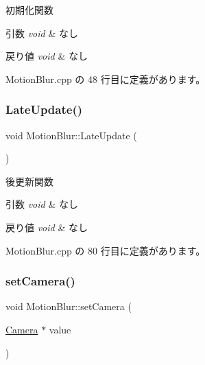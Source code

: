 初期化関数 


\begin{DoxyParams}{引数}
{\em void} & なし \\
\hline
\end{DoxyParams}

\begin{DoxyRetVals}{戻り値}
{\em void} & なし \\
\hline
\end{DoxyRetVals}


 Motion\+Blur.\+cpp の 48 行目に定義があります。

\mbox{\label{class_motion_blur_a5fcf35d649a2e1174e5fdaa0ee168a9f}} 
\subsubsection{\texorpdfstring{Late\+Update()}{LateUpdate()}}
{\footnotesize\ttfamily void Motion\+Blur\+::\+Late\+Update (\begin{DoxyParamCaption}{ }\end{DoxyParamCaption})}



後更新関数 


\begin{DoxyParams}{引数}
{\em void} & なし \\
\hline
\end{DoxyParams}

\begin{DoxyRetVals}{戻り値}
{\em void} & なし \\
\hline
\end{DoxyRetVals}


 Motion\+Blur.\+cpp の 80 行目に定義があります。

\mbox{\label{class_motion_blur_ab4f38538f4a0ca8e444109aa090537ee}} 
\subsubsection{\texorpdfstring{set\+Camera()}{setCamera()}}
{\footnotesize\ttfamily void Motion\+Blur\+::set\+Camera (\begin{DoxyParamCaption}\item[{\mbox{\hyperlink{class_camera}{Camera}} $\ast$}]{value }\end{DoxyParamCaption})}



